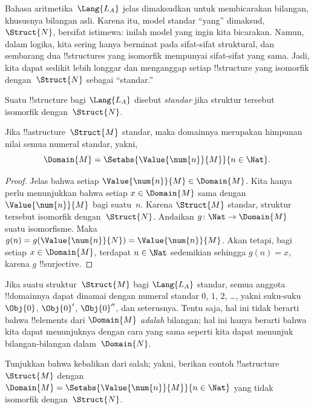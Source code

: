 \documentclass[../../../include/open-logic-section]{subfiles}
\begin{document}

Bahasa aritmetika~$\Lang{L_A}$ jelas dimaksudkan untuk membicarakan bilangan,
khususnya bilangan asli. Karena itu, model standar ``yang'' dimaksud,
$\Struct{N}$, bersifat istimewa: inilah model yang ingin kita bicarakan.
Namun, dalam logika, kita sering hanya berminat pada sifat-sifat struktural,
dan sembarang dua !!{structure}s yang isomorfik mempunyai sifat-sifat yang
sama. Jadi, kita dapat sedikit lebih longgar dan menganggap setiap
!!{structure} yang isomorfik dengan~$\Struct{N}$ sebagai ``standar.''

\begin{defn}
Suatu !!{structure} bagi $\Lang{L_A}$ disebut \emph{standar} jika struktur
tersebut isomorfik dengan~$\Struct{N}$.
\end{defn}

\begin{prop}
 Jika !!a{structure}~$\Struct{M}$ standar, maka
domainnya merupakan himpunan nilai semua numeral standar, yakni,
\[
\Domain{M} = \Setabs{\Value{\num{n}}{M}}{n \in \Nat}.
\]
\end{prop}

\begin{proof}
Jelas bahwa setiap $\Value{\num{n}}{M} \in \Domain{M}$. Kita hanya perlu
menunjukkan bahwa setiap $x \in \Domain{M}$ sama dengan
$\Value{\num{n}}{M}$ bagi suatu~$n$. Karena $\Struct{M}$ standar, struktur
tersebut isomorfik dengan~$\Struct{N}$. Andaikan $g\colon \Nat \to
\Domain{M}$ suatu isomorfisme. Maka $g(n) = g(\Value{\num{n}}{N}) =
\Value{\num{n}}{M}$. Akan tetapi, bagi setiap $x \in \Domain{M}$, terdapat
$n \in \Nat$ sedemikian sehingga $g(n) = x$, karena $g$ !!{surjective}.
\end{proof}

\begin{explain}
Jika suatu struktur~$\Struct{M}$ bagi $\Lang{L_A}$ standar, semua anggota
!!{domain}nya dapat dinamai dengan numeral standar $\num{0}$, $\num{1}$,
$\num{2}$, \dots, yakni suku-suku $\Obj{0}$, $\Obj{0}'$, $\Obj{0}''$, dan
seterusnya. Tentu saja, hal ini tidak berarti bahwa !!{element}s dari
$\Domain{M}$ \emph{adalah} bilangan; hal ini hanya berarti bahwa kita dapat
menunjuknya dengan cara yang sama seperti kita dapat menunjuk bilangan-bilangan
dalam~$\Domain{N}$.
\end{explain}

\begin{prob}
Tunjukkan bahwa kebalikan dari
 salah; yakni, berikan contoh
!!a{structure}~$\Struct{M}$ dengan
$\Domain{M} = \Setabs{\Value{\num{n}}{M}}{n \in \Nat}$ yang tidak isomorfik
dengan~$\Struct{N}$.
\end{prob}
\end{document}
